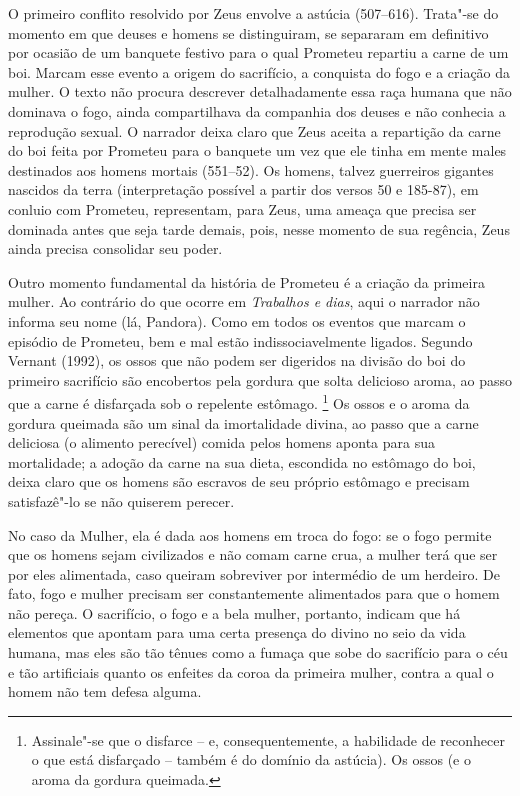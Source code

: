 O primeiro conflito resolvido por Zeus envolve a astúcia (507--616). Trata"-se
do momento em que deuses e homens se distinguiram, se separaram em definitivo
por ocasião de um banquete festivo para o qual Prometeu repartiu a carne de um
boi. Marcam esse evento a origem do sacrifício, a conquista do fogo e a criação
da mulher. O texto não procura descrever detalhadamente essa raça humana que
não dominava o fogo, ainda compartilhava da companhia dos deuses e não conhecia
a reprodução sexual. 
O narrador deixa claro que Zeus aceita a repartição da carne do boi feita por
Prometeu para o banquete um vez que ele tinha em mente males destinados aos homens
mortais (551--52). Os homens, talvez guerreiros gigantes nascidos da terra
(interpretação possível a partir dos versos 50 e 185-87), em conluio com
Prometeu, representam, para Zeus, uma ameaça que precisa ser dominada antes que
seja tarde demais, pois, nesse momento de sua regência, Zeus ainda precisa
consolidar seu poder. 

Outro momento fundamental da história de Prometeu é a criação da primeira
mulher. Ao contrário do que ocorre em \textit{Trabalhos e dias}, aqui o
narrador não informa seu nome (lá, Pandora). Como em todos os eventos que
marcam o episódio de Prometeu, bem e mal estão indissociavelmente ligados. 
Segundo Vernant (1992), os ossos que não podem ser digeridos na divisão do boi
do primeiro sacrifício são encobertos pela gordura que solta delicioso aroma,
ao passo que a carne é disfarçada sob o repelente estômago. 
\footnote{ Assinale"-se que o
disfarce – e, consequentemente, a habilidade de reconhecer o que está
disfarçado – também é do domínio da astúcia). Os ossos (e o aroma da gordura
queimada.} 
Os ossos e o aroma da gordura queimada são um sinal da imortalidade divina, ao passo que a carne deliciosa
(o alimento perecível) comida pelos homens aponta para sua mortalidade; a
adoção da carne na sua dieta, escondida no estômago do boi, deixa claro que os
homens são escravos de seu próprio estômago e precisam satisfazê"-lo se não
quiserem perecer. 

No caso da Mulher, ela é dada aos homens em troca do fogo: se o fogo permite
que os homens sejam civilizados e não comam carne crua, a mulher terá que ser
por eles alimentada, caso queiram sobreviver por intermédio de um herdeiro. De
fato, fogo e mulher precisam ser constantemente alimentados para que o homem
não pereça. O sacrifício, o fogo e a bela mulher, portanto, indicam que há
elementos que apontam para uma certa presença do divino no seio da vida humana,
mas eles são tão tênues como a fumaça que sobe do sacrifício para o céu e tão
artificiais quanto os enfeites da coroa da primeira mulher, contra a qual o
homem não tem defesa alguma.

